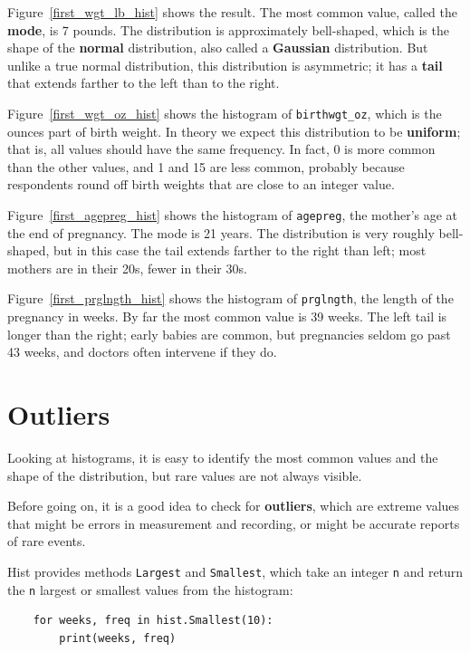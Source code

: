 \documentclass[12pt]{book}
\begin{document}
Figure~\ref{first_wgt_lb_hist} shows the result.  The most common
value, called the {\bf mode}, is 7 pounds.  The distribution is
approximately bell-shaped, which is the shape of the {\bf normal}
distribution, also called a {\bf Gaussian} distribution.  But unlike a
true normal distribution, this distribution is asymmetric; it has
a {\bf tail} that extends farther to the left than to the right.

Figure~\ref{first_wgt_oz_hist} shows the histogram of
\verb"birthwgt_oz", which is the ounces part of birth weight.  In
theory we expect this distribution to be {\bf uniform}; that is, all
values should have the same frequency.  In fact, 0 is more common than
the other values, and 1 and 15 are less common, probably because
respondents round off birth weights that are close to an integer
value.

Figure~\ref{first_agepreg_hist} shows the histogram of \verb"agepreg",
the mother's age at the end of pregnancy.  The mode is 21 years.  The
distribution is very roughly bell-shaped, but in this case the tail
extends farther to the right than left; most mothers are in
their 20s, fewer in their 30s.

Figure~\ref{first_prglngth_hist} shows the histogram of
\verb"prglngth", the length of the pregnancy in weeks.  By far the
most common value is 39 weeks.  The left tail is longer than the
right; early babies are common, but pregnancies seldom go past 43
weeks, and doctors often intervene if they do.


\section{Outliers}

Looking at histograms, it is easy to identify the most common
values and the shape of the distribution, but rare values are
not always visible.

Before going on, it is a good idea to check for {\bf
  outliers}, which are extreme values that might be errors in
measurement and recording, or might be accurate reports of rare
events.

Hist provides methods {\tt Largest} and {\tt Smallest}, which take
an integer {\tt n} and return the {\tt n} largest or smallest
values from the histogram:

\begin{verbatim}
    for weeks, freq in hist.Smallest(10):
        print(weeks, freq)
\end{verbatim}
\end{document}

